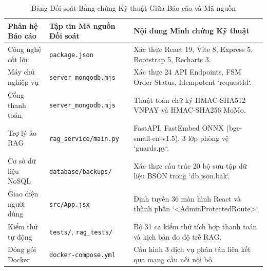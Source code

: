 \documentclass[12pt,a4paper]{report}
\begin{document}
\begin{table}[H]
\centering
\caption{Bảng Đối soát Bằng chứng Kỹ thuật Giữa Báo cáo và Mã nguồn}
\label{tab:trace_summary_full}
\begin{tabularx}{\textwidth}{p{3.5cm}p{4.2cm}X}
\toprule
\textbf{Phân hệ Báo cáo} & \textbf{Tập tin Mã nguồn Đối soát} & \textbf{Nội dung Minh chứng Kỹ thuật} \\
\midrule
Công nghệ cốt lõi & \texttt{package.json} & Xác thực React 19, Vite 8, Express 5, Bootstrap 5, Recharts 3. \\
\addlinespace
Máy chủ nghiệp vụ & \texttt{server\_mongodb.mjs} & Xác thực 24 API Endpoints, FSM Order Status, Idempotent `requestId`. \\
\addlinespace
Cổng thanh toán & \texttt{server\_mongodb.mjs} & Thuật toán chữ ký HMAC-SHA512 VNPAY và HMAC-SHA256 MoMo. \\
\addlinespace
Trợ lý ảo RAG & \texttt{rag\_service/main.py} & FastAPI, FastEmbed ONNX (bge-small-en-v1.5), 3 lớp phòng vệ `guards.py`. \\
\addlinespace
Cơ sở dữ liệu NoSQL & \texttt{database/backups/} & Xác thực cấu trúc 20 bộ sưu tập dữ liệu BSON trong `db.json.bak`. \\
\addlinespace
Giao diện người dùng & \texttt{src/App.jsx} & Định tuyến 36 màn hình React và thành phần `<AdminProtectedRoute>`. \\
\addlinespace
Kiểm thử tự động & \texttt{tests/}, \texttt{rag\_tests/} & Bộ 31 ca kiểm thử tích hợp thanh toán và kịch bản đo độ trễ RAG. \\
\addlinespace
Đóng gói Docker & \texttt{docker-compose.yml} & Cấu hình 3 dịch vụ phân tán liên kết qua mạng cầu nối nội bộ. \\
\bottomrule
\end{tabularx}
\end{table}

\nocite{*}


\end{document}
